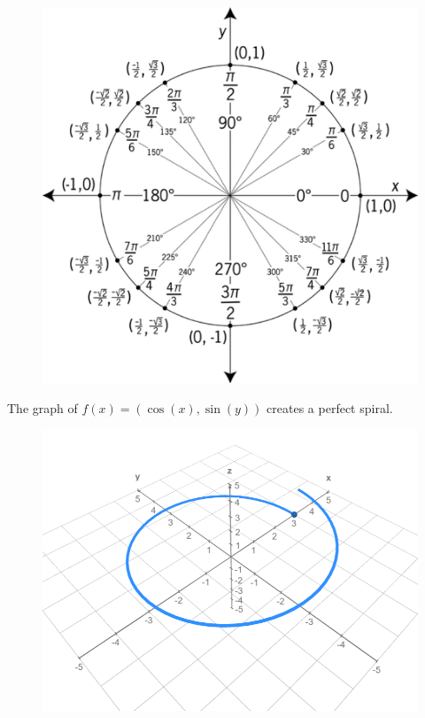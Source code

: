 \documentclass{article}
\begin{document}
\begin{figure}[h!]
    \centering
    \includegraphics[scale=.1]{unitcircle.png}
    \label{}
\end{figure}
The graph of $f(x)=(\cos(x),\sin(y))$ creates a perfect spiral.
\begin{figure}[h!]
    \centering
    \includegraphics[scale=.3]{unitcirclespiral.png}
    \caption{}
    \label{}
\end{figure}
\end{document}
